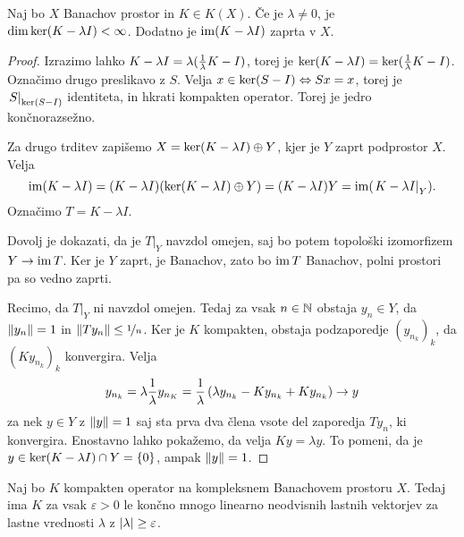 \begin{trditev}
  Naj bo $X$ Banachov prostor in $K \in K(X)$.
  Če je $\lambda \ne 0$, je $\dim \operatorname{ker} (K - \lambda I) < \infty$.
  Dodatno je $\operatorname{im}(K - \lambda I)$ zaprta v $X$.
\end{trditev}

\begin{proof}
  Izrazimo lahko $K - \lambda I = \lambda (\frac{1}{\lambda} K - I)$, torej je
  $\operatorname{ker} (K - \lambda I) = \operatorname{ker} (\frac{1}{\lambda} K - I)$.
  Označimo drugo preslikavo z $S$.
  Velja $x \in \operatorname{ker} (S - I) \Leftrightarrow Sx = x$, torej je $\left. S \right|_{\operatorname{ker}
	(S-I)}$ identiteta, in hkrati kompakten operator.
  Torej je jedro končnorazsežno.

  Za drugo trditev zapišemo $X = \operatorname{ker}(K - \lambda I) \oplus Y$, kjer je $Y$
  zaprt podprostor $X$.
  Velja
  \[
	\operatorname{im} (K - \lambda I)
	= (K - \lambda I) (\operatorname{ker} (K - \lambda I) \oplus Y)
	= (K - \lambda I) Y
	= \operatorname{im} (\left. K - \lambda I \right|_Y).
  \]
  Označimo $T = K - \lambda I$.

  Dovolj je dokazati, da je $\left. T \right|_Y$ navzdol omejen, saj bo potem
  topološki izomorfizem $Y \to \operatorname{im} T$.
  Ker je $Y$ zaprt, je Banachov, zato bo $\operatorname{im} T$ Banachov, polni prostori pa so
  vedno zaprti.

  Recimo, da $\left. T \right|_Y$ ni navzdol omejen.
  Tedaj za vsak $n \in \mathbb{N}$ obstaja $y_n \in Y$, da $\left\lVert y_n\right\rVert = 1$ in $\left\lVert T
	y_n\right\rVert \le \nicefrac{1}{n}$.
  Ker je $K$ kompakten, obstaja podzaporedje $(y_{n_k})_k$, da $(K
  y_{n_k})_k$ konvergira.
  Velja
  \[
	y_{n_k} = \lambda \frac{1}{\lambda} y_{n_K} = \frac{1}{\lambda} \left( \lambda
	  y_{n_k} - K y_{n_k} + K y_{n_k} \right) \to y
  \]
  za nek $y \in Y$ z $\left\lVert y\right\rVert = 1$ saj sta prva dva člena vsote del zaporedja
  $T y_n$, ki konvergira.
  Enostavno lahko pokažemo, da velja $Ky = \lambda y$.
  To pomeni, da je $y \in \operatorname{ker} (K - \lambda I) \cap Y = \{0\}$, ampak
  $\left\lVert y\right\rVert = 1$.
  \protislovje{}
\end{proof}

\begin{lema}
  Naj bo $K$ kompakten operator na kompleksnem Banachovem prostoru $X$.
  Tedaj ima $K$ za vsak $\varepsilon > 0$ le končno mnogo linearno neodvisnih
  lastnih vektorjev za lastne vrednosti $\lambda$ z $\left| \lambda \right| \ge
  \varepsilon$.
\end{lema}

